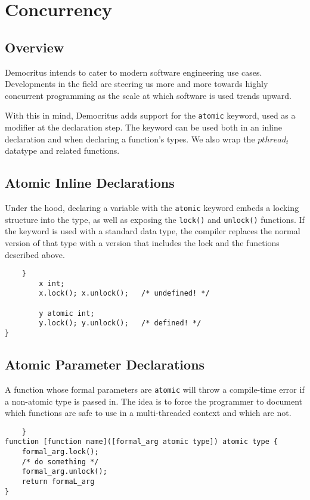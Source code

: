 \chapter{Concurrency}
	\section{Overview}
		Democritus intends to cater to modern software engineering use cases. Developments in the field are steering us more and more towards highly concurrent programming as the scale at which software is used trends upward.

		\vspace{5mm}
		\noindent
		With this in mind, Democritus adds support for the \texttt{atomic} keyword, used as a modifier at the declaration step. The keyword can be used both in an inline declaration and when declaring a function's types. We also wrap the \texttt{$pthread_t$} datatype and related functions.

	\section{Atomic Inline Declarations}
		Under the hood, declaring a variable with the \texttt{atomic} keyword embeds a locking structure into the type, as well as exposing the \texttt{lock()} and \texttt{unlock()} functions. If the keyword is used with a standard data type, the compiler replaces the normal version of that type with a version that includes the lock and the functions described above.

		\begin{lstlisting}
	}
		x int;
		x.lock(); x.unlock();	/* undefined! */

		y atomic int;
		y.lock(); y.unlock();	/* defined! */
}
		\end{lstlisting}

	\section{Atomic Parameter Declarations}
		A function whose formal parameters are \texttt{atomic} will throw a compile-time error if a non-atomic type is passed in. The idea is to force the programmer to document which functions are safe to use in a multi-threaded context and which are not.

		\begin{lstlisting}
	}
function [function name]([formal_arg atomic type]) atomic type {
	formal_arg.lock();
	/* do something */
	formal_arg.unlock();
	return formaL_arg
}
		\end{lstlisting}

